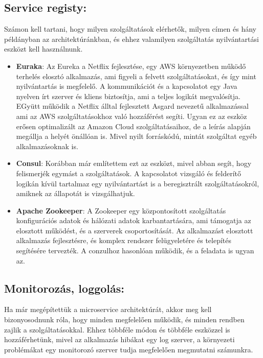 \documentclass[11pt,magyar,a4paper,oneside,]{report}
\begin{document}
\subsection{Service registy:}\label{service-registy}

Számon kell tartani, hogy milyen szolgáltatások elérhetők, milyen címen
és hány példányban az architektúránkban, és ehhez valamilyen
szolgáltatás nyilvántartási eszközt kell használnunk.

\begin{itemize}
\item
  \textbf{Euraka}: Az Eureka a Netflix fejlesztése, egy AWS környezetben
  működő terhelés elosztó alkalmazás, ami figyeli a felvett
  szolgáltatásokat, és így mint nyilvántartás is megfelelő. A
  kommunikációt és a kapcsolatot egy Java nyelven írt szerver és kliens
  biztosítja, ami a teljes logikát megvalósítja. EGyütt működik a
  Netflix álltal fejlesztett Asgard nevezetű alkalmazással ami az AWS
  szolgáltatásokhoz való hozzáférést segíti. Ugyan ez az eszköz erősen
  optimalizált az Amazon Cloud szolgáltatásaihoz, de a leírás alapján
  megállja a helyét önállóan is. Mivel nyilt forráskódú, mintát
  szolgáltat egyéb alkalmazásoknak is.
\item
  \textbf{Consul}: Korábban már említettem ezt az eszközt, mivel abban
  segít, hogy felismerjék egymást a szolgáltatások. A kapcsolatot
  vizsgáló és felderítő logikán kívül tartalmaz egy nyilvántartást is a
  beregisztrált szolgáltatásokról, amiknek az állapotát is
  vizsgálhatjuk.
\item
  \textbf{Apache Zookeeper}: A Zookeeper egy központosított szolgáltatás
  konfigurációs adatok és hálózati adatok karbantartására, ami támogatja
  az elosztott működést, és a szerverek csoportosítását. Az alkalmazást
  elosztott alkalmazás fejlesztésre, és komplex rendszer felügyeletére
  és telepítés segítésére tervezték. A conzulhoz hasonlóan működik, és a
  feladata is ugyan az.
\end{itemize}

\subsection{Monitorozás, loggolás:}\label{monitorozuxe1s-loggoluxe1s}

Ha már megépítettük a microservice architektúrát, akkor meg kell
bizonyosodnunk róla, hogy minden megfelelően működik, és minden rendben
zajlik a szolgáltatásokkal. Ehhez többféle módon és többféle eszközzel
is hozzáférhetünk, mivel az alkalmazás hibákat egy log szerver, a
környezeti problémákat egy monitorozó szerver tudja megfelelően
megmutatni számunkra.
\end{document}
